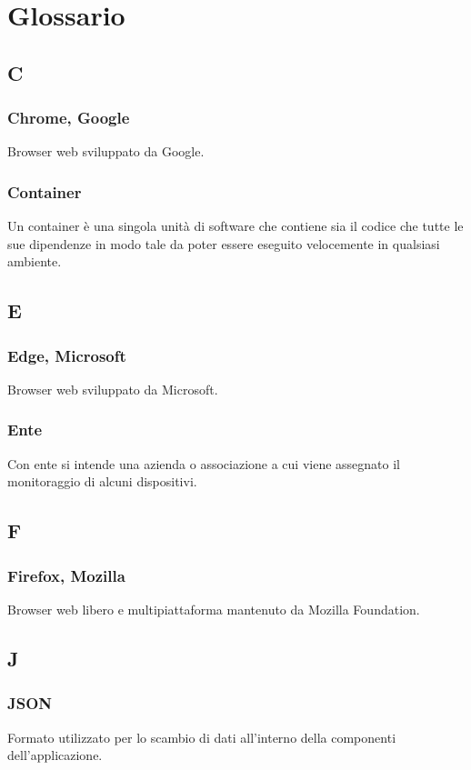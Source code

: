 \appendix
{}

\section{Glossario}
\subsection{C}
\subsubsection*{Chrome, Google}
Browser web sviluppato da Google.
\subsubsection*{Container}
Un container è una singola unità di software che contiene sia il codice che tutte le sue dipendenze in modo tale da poter essere eseguito velocemente in qualsiasi ambiente.
\subsection{E}
\subsubsection*{Edge, Microsoft}
Browser web sviluppato da Microsoft.
\subsubsection*{Ente}
Con ente si intende una azienda o associazione a cui viene assegnato il monitoraggio di alcuni dispositivi.
\subsection{F}
\subsubsection*{Firefox, Mozilla}
Browser web libero e multipiattaforma mantenuto da Mozilla Foundation.
\subsection{J}
\subsubsection*{JSON}
Formato utilizzato per lo scambio di dati all'interno della componenti dell'applicazione.
